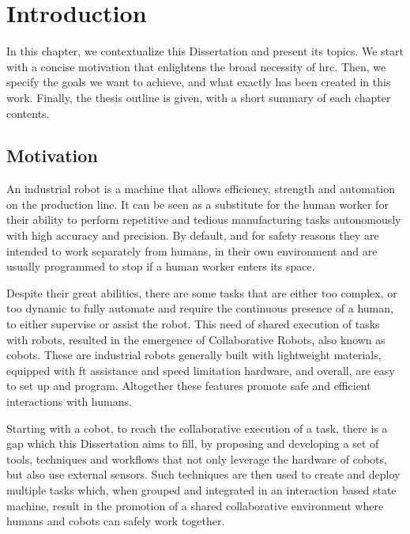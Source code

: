 \chapter{Introduction}
\label{chp:1-intro}

\par In this chapter, we contextualize this Dissertation and present its topics. We start with a concise motivation that enlightens the broad necessity of \ac{hrc}. Then, we specify the goals we want to achieve, and what exactly has been created in this work. Finally, the thesis outline is given, with a short summary of each chapter contents.





\section{Motivation}

\par An industrial robot is a machine that allows efficiency, strength and automation on the production line. It can be seen as a substitute for the human worker for their ability to perform repetitive and tedious manufacturing tasks autonomously with high accuracy and precision. By default, and for safety reasons they are intended to work separately from humans, in their own environment and are usually programmed to stop if a human worker enters its space.

\par Despite their great abilities, there are some tasks that are either too complex, or too dynamic to fully automate and require the continuous presence of a human, to either supervise or assist the robot. This need of shared execution of tasks with robots, resulted in the emergence of Collaborative Robots, also known as \acsp{cobot}. These are industrial robots generally built with lightweight materials, equipped with \ac{ft} assistance and speed limitation hardware, and overall, are easy to set up and program. Altogether these features promote safe and efficient interactions with humans.

\par Starting with a cobot, to reach the collaborative execution of a task, there is a gap which this Dissertation aims to fill, by proposing and developing a set of tools, techniques and workflows that not only leverage the hardware of cobots, but also use external sensors. Such techniques are then used to create and deploy multiple tasks which, when grouped and integrated in an interaction based state machine, result in the promotion of a shared collaborative environment where humans and cobots can safely work together. 





